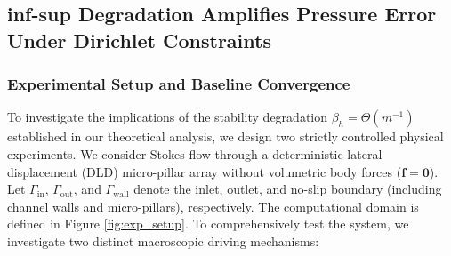 \documentclass{elsarticle}
\begin{document}
\subsection{inf-sup Degradation Amplifies Pressure Error Under Dirichlet Constraints}\label{subsec:validation_convergence}

\subsubsection{Experimental Setup and Baseline Convergence}

To investigate the implications of the stability degradation $\beta_h = \Theta(m^{-1})$ established in our theoretical analysis, we design two strictly controlled physical experiments. We consider Stokes flow through a deterministic lateral displacement (DLD) micro-pillar array without volumetric body forces ($\mathbf{f} = \mathbf{0}$). Let $\Gamma_{\mathrm{in}}$, $\Gamma_{\mathrm{out}}$, and $\Gamma_{\mathrm{wall}}$ denote the inlet, outlet, and no-slip boundary (including channel walls and micro-pillars), respectively. The computational domain is defined in Figure \ref{fig:exp_setup}.
To comprehensively test the system, we investigate two distinct macroscopic driving mechanisms:
\end{document}
